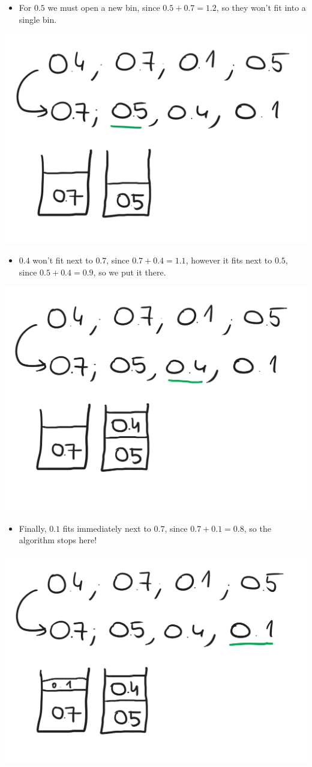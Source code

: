 \begin{itemize}
    \item For $0.5$ we must open a new bin, since $0.5+0.7=1.2$, so they won't fit into a single bin.
\end{itemize}

\begin{center}
    \includegraphics[width=0.5\linewidth]{10/01/ffd_02.png}
\end{center}

\begin{itemize}
    \item $0.4$ won't fit next to $0.7$, since $0.7+0.4=1.1$, however it fits next to $0.5$, since $0.5+0.4=0.9$, so we put it there.
\end{itemize}

\begin{center}
    \includegraphics[width=0.5\linewidth]{10/01/ffd_03.png}
\end{center}

\begin{itemize}
    \item Finally, $0.1$ fits immediately next to $0.7$, since $0.7+0.1=0.8$, so the algorithm stops here!
\end{itemize}

\begin{center}
    \includegraphics[width=0.5\linewidth]{10/01/ffd_04.png}
\end{center}

